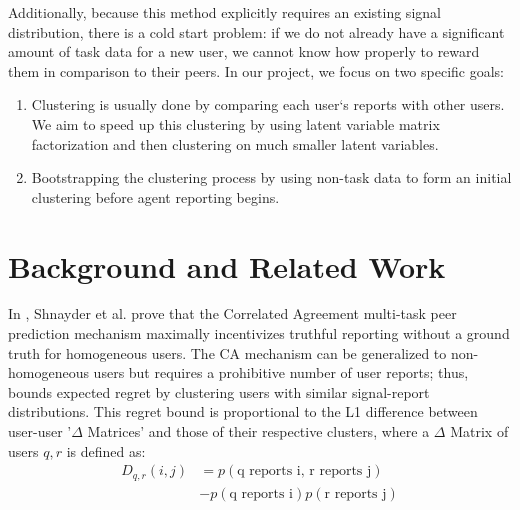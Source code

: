 \documentclass{article}
\begin{document}
Additionally, because this method explicitly requires an existing signal distribution, there is a cold start problem: if we do not already have a significant amount of task data for a new user, we cannot know how properly to reward them in comparison to their peers. In our project, we focus on two specific goals:
\begin{enumerate}
\item Clustering is usually done by comparing each user`s reports with other users. We aim to speed up this clustering by using latent variable matrix factorization and then clustering on much smaller latent variables.
\item Bootstrapping the clustering process by using non-task data to form an initial clustering before agent reporting begins.
\end{enumerate}

\section{Background and Related Work}\label{sec:Background}

In \citet{shnayder2016informed}, Shnayder et al. prove that the Correlated Agreement multi-task peer prediction mechanism maximally incentivizes truthful reporting without a ground truth for homogeneous users. The CA mechanism can be generalized to non-homogeneous users but requires a prohibitive number of user reports; thus, \citet{agarwal2017} bounds expected regret by clustering users with similar signal-report distributions.  This regret bound is proportional to the L1 difference between user-user '$\Delta$ Matrices' and those of their respective clusters, where a $\Delta$ Matrix of users $q,r$ is defined as: 
\begin{align*}
D_{q,r}(i,j) &= p(\textrm{q reports i, r reports j}) \\
&- p(\textrm{q reports i})p(\textrm{r reports j})
\end{align*}
\end{document}
